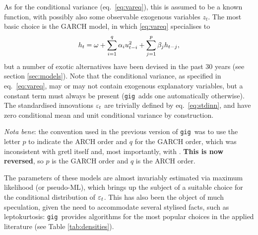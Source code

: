 \documentclass[a4paper,11pt]{article}
\newcommand{\app}[1]{\textsf{#1}}
\newcommand{\tip}[1]{\par\vspace{4pt}
 \ding{43} {\small \sffamily #1}\par\smallskip}
\newcommand{\stdu}{\ensuremath \varepsilon}
\newcommand{\uhat}{\ensuremath u}
\newcommand{\gig}{\texttt{gig}}
\begin{document}
As for the conditional variance (eq.~\ref{eq:vareq}), this is assumed
to be a known function, with possibly also some observable exogenous
variables $z_t$. The most basic choice is the GARCH model, in which
\eqref{eq:vareq} specialises to
\[
  h_t = \omega +  \sum_{i=1}^q \alpha_i \uhat_{t-i}^2 +
  \sum_{j=1}^p\beta_j h_{t-j} ,
\]
but a number of exotic alternatives have been devised in the past 30
years (see section \ref{sec:models}). Note that the conditional
variance, as specified in eq.~\eqref{eq:vareq}, may or may not contain
exogenous explanatory variables, but a constant term must always be
present (\gig\ adds one automatically otherwise). The
standardised innovations $\stdu_t$ are trivially defined by
eq.~\eqref{eq:stdinn}, and have zero conditional mean and unit
conditional variance by construction.

\tip{\emph{Nota bene}: the convention used in the previous version of \gig\
was to use the letter $p$ to indicate the ARCH order and $q$ for the
GARCH order, which was inconsistent with \app{gretl} itself and, most
importantly, with \cite{Bollerslev-86}. \textbf{This is now reversed},
so $p$ is the GARCH order and $q$ is the ARCH order.}


The parameters of these models are almost invariably estimated via
maximum likelihood (or pseudo-ML), which brings up the subject of a
suitable choice for the conditional distribution of $\stdu_t$.  This has
also been the object of much speculation, given the need to
accommodate several stylised facts, such as leptokurtosis:
\gig\ provides algorithms for the most popular choices in the
applied literature (see Table \ref{tab:densities}).
\end{document}
